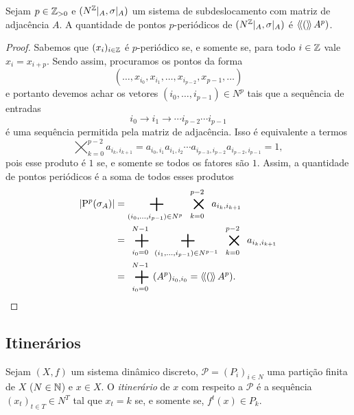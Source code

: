 \begin{proposition}
Sejam $p \in \mathbb{Z}_{>0}$ e $(N^{\mathbb{Z}}|_A,\sigma|_A)$ um sistema de subdeslocamento com matriz de adjacência $A$. A quantidade de pontos $p$-periódicos de $(N^{\mathbb{Z}}|_A,\sigma|_A)$ é $\left\langle\!\left\langle{(}\right\rangle\!\right\rangle A^p)$.
\end{proposition}
\begin{proof}
Sabemos que $(x_i)_{i \in \mathbb{Z}}$ é $p$-periódico se, e somente se, para todo $i \in \mathbb{Z}$ vale $x_i = x_{i+p}$. Sendo assim, procuramos os pontos da forma
	\begin{equation*}
	(\ldots,x_{i_0},x_{i_1},\ldots,x_{i_{p-2}},x_{p-1},\ldots)
	\end{equation*}
e portanto devemos achar os vetores $(i_0,\ldots,i_{p-1}) \in N^p$ tais que a sequência de entradas
	\begin{equation*}
	i_0 \rightarrow i_1 \rightarrow \cdots i_{p-2} \cdots i_{p-1}
	\end{equation*}
é uma sequência permitida pela matriz de adjacência. Isso é equivalente a termos
	\begin{equation*}
	\bigtimes_{k=0}^{p-2} a_{i_k,i_{k+1}} = a_{i_0,i_1}a_{i_1,i_2}\cdots a_{i_{p-3},i_{p-2}}a_{i_{p-2},i_{p-1}} = 1,
	\end{equation*}
pois esse produto é $1$ se, e somente se todos os fatores são $1$. Assim, a quantidade de pontos periódicos é a soma de todos esses produtos
	\begin{align*}
	\abs{\Per[p](\sigma_A)} &= \sum_{(i_0,\ldots,i_{p-1}) \in N^p} \bigtimes_{k=0}^{p-2} a_{i_k,i_{k+1}} \\
		&= \sum_{i_0=0}^{N-1} \sum_{(i_1,\ldots,i_{p-1}) \in N^{p-1}} \bigtimes_{k=0}^{p-2} a_{i_k,i_{k+1}} \\
		&= \sum_{i_0=0}^{N-1} (A^p)_{i_0,i_0} = \tr(A^p).
	\end{align*}
\end{proof}

\subsection{Itinerários}

\begin{definition}
Sejam $(X,f)$ um sistema dinâmico discreto, $\mathcal P=(P_i)_{i \in N}$ uma partição finita de $X$ ($N \in \mathbb{N}$) e $x \in X$. O \emph{itinerário} de $x$ com respeito a $\mathcal P$ é a sequência
$(x_t)_{t \in T} \in N^T$ tal que $x_t=k$ se, e somente se, $f^t(x) \in P_k$.
\end{definition}

